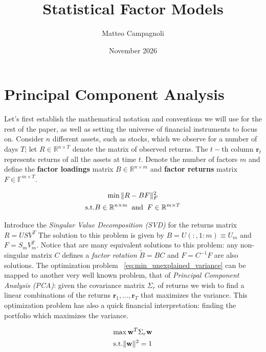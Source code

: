\documentclass{article}
\title{Statistical Factor Models}
\author{Matteo Campagnoli}
\date{November 2026}
\numberwithin{equation}{subsection}
\begin{document}
\maketitle
\tableofcontents

\clearpage

\section{Principal Component Analysis}
Let's first establish the mathematical notation and conventions we will use for the rest of the paper, as well as setting the universe of financial instruments to focus on. Consider $n$ different assets, such as stocks, which we observe for a number of days $T$; let $R \in \mathbb{R}^{n \times T}$ denote the matrix of observed returns. The $t-$th column $\mathbf{r}_t$ represents returns of all the assets at time $t$. Denote the number of factors $m$ and define the \textbf{factor loadings} matrix $B \in \mathbb{R}^{n \times m}$ and \textbf{factor returns} matrix $F \in \mathbb{F}^{m \times T}$.

\begin{gather}
\label{eq:min_unexplained_variance}
    \min \Vert R - BF \Vert^2_F \\
    \text{s.t.} B \in \mathbb{R}^{n \times m} \;\; \text{and} \;\; F \in \mathbb{R}^{m \times T} \notag 
\end{gather}

Introduce the \textit{Singular Value Decomposition (SVD)} for the returns matrix $R = U S V^T$
The solution to this problem is given by $B = U(:, 1:m) \equiv U_m$ and $F = S_m V_m^T$. Notice that are many equivalent solutions to this problem: any non-singular matrix $C$ defines a \textit{factor rotation} $\tilde{B} = BC$ and $F = C^{-1}F$ are also solutions. 
The optimization problem ~\ref{eq:min_unexplained_variance} can be mapped to another very well known problem, that of \textit{Principal Component Analysis (PCA)}: given the covariance matrix $\Sigma_r$ of returns we wish to find a linear combinations of the returns $\mathbf{r}_1,...,\mathbf{r}_T$ that maximizes the variance. This optimization problem has also a quick financial interpretation: finding the portfolio which maximizes the variance.

\begin{gather}
\label{eq:max_portfolio_variance}
\max \mathbf{w}^T \Sigma_r \mathbf{w} \\
\text{s.t.} \Vert \mathbf{w} \Vert^2 = 1 \notag
\end{gather}
\end{document}
